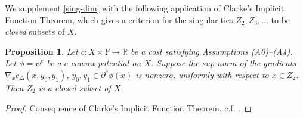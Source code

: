 \documentclass[12pt]{amsart}
\newtheorem{lem}{Lemma}
\newtheorem{prop}{Proposition}
\theoremstyle{definition}
\newtheorem{dfn}{Definition}
\theoremstyle{remark}
\newcommand{\bR}{\mathbb{R}}
\newcommand{\del}{\partial}
\newcommand{\cd}{c_\Delta}
\begin{document}
We supplement \ref{sing-dim} with the following application of Clarke's Implicit Function Theorem, which gives a criterion for the singularities $Z_2, Z_3, \ldots$ to be \emph{closed} subsets of $X$.
 



\begin{prop} 
\label{closedZ}
Let $c:X\times Y \to \bR$ be a cost satisfying Assumptions (A0)--(A4). Let $\phi=\psi^c$ be a $c$-convex potential on $X$. Suppose the sup-norm of the gradients $\nabla_x \cd(x,y_0, y_1)$, $y_0, y_1\in \del^c \phi(x)$ is nonzero, uniformly with respect to $x\in Z_2$. Then $Z_2$ is a closed subset of $X$. 


\end{prop}
\begin{proof}
Consequence of Clarke's Implicit Function Theorem, c.f. \cite[Proof of Theorem 10.50, pp.262--264]{Vil1}.
\end{proof}
\end{document}
